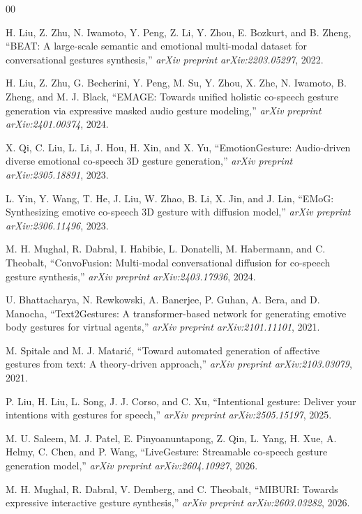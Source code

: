 \documentclass[conference]{IEEEtran}
\begin{document}

\begin{thebibliography}{00}

H. Liu, Z. Zhu, N. Iwamoto, Y. Peng, Z. Li, Y. Zhou, E. Bozkurt, and B. Zheng,
``BEAT: A large-scale semantic and emotional multi-modal dataset for conversational gestures synthesis,''
\emph{arXiv preprint arXiv:2203.05297}, 2022.

H. Liu, Z. Zhu, G. Becherini, Y. Peng, M. Su, Y. Zhou, X. Zhe, N. Iwamoto, B. Zheng, and M. J. Black,
``EMAGE: Towards unified holistic co-speech gesture generation via expressive masked audio gesture modeling,''
\emph{arXiv preprint arXiv:2401.00374}, 2024.

X. Qi, C. Liu, L. Li, J. Hou, H. Xin, and X. Yu,
``EmotionGesture: Audio-driven diverse emotional co-speech 3D gesture generation,''
\emph{arXiv preprint arXiv:2305.18891}, 2023.

L. Yin, Y. Wang, T. He, J. Liu, W. Zhao, B. Li, X. Jin, and J. Lin,
``EMoG: Synthesizing emotive co-speech 3D gesture with diffusion model,''
\emph{arXiv preprint arXiv:2306.11496}, 2023.

M. H. Mughal, R. Dabral, I. Habibie, L. Donatelli, M. Habermann, and C. Theobalt,
``ConvoFusion: Multi-modal conversational diffusion for co-speech gesture synthesis,''
\emph{arXiv preprint arXiv:2403.17936}, 2024.

U. Bhattacharya, N. Rewkowski, A. Banerjee, P. Guhan, A. Bera, and D. Manocha,
``Text2Gestures: A transformer-based network for generating emotive body gestures for virtual agents,''
\emph{arXiv preprint arXiv:2101.11101}, 2021.

M. Spitale and M. J. Matari\'{c},
``Toward automated generation of affective gestures from text: A theory-driven approach,''
\emph{arXiv preprint arXiv:2103.03079}, 2021.

P. Liu, H. Liu, L. Song, J. J. Corso, and C. Xu,
``Intentional gesture: Deliver your intentions with gestures for speech,''
\emph{arXiv preprint arXiv:2505.15197}, 2025.

M. U. Saleem, M. J. Patel, E. Pinyoanuntapong, Z. Qin, L. Yang, H. Xue, A. Helmy, C. Chen, and P. Wang,
``LiveGesture: Streamable co-speech gesture generation model,''
\emph{arXiv preprint arXiv:2604.10927}, 2026.

M. H. Mughal, R. Dabral, V. Demberg, and C. Theobalt,
``MIBURI: Towards expressive interactive gesture synthesis,''
\emph{arXiv preprint arXiv:2603.03282}, 2026.


\end{thebibliography}
\end{document}

